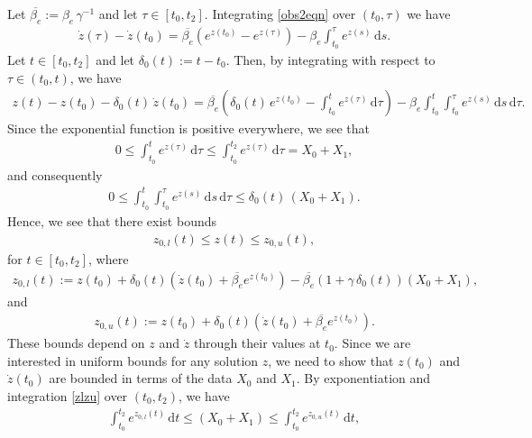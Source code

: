 \documentclass{article}
\newcommand{\ds}{\text{d}s}
\newcommand{\dtau}{\text{d}\tau}
\newcommand{\dt}{\text{d}t}
\newcommand{\be}{\beta_e}
\newcommand{\bb}{\overline{\be}}
\begin{document}
\proof Let $\bb := \be \, \gamma^{-1}$ and let $\tau \in [t_0,t_2]$. Integrating \eqref{obs2eqn} over $(t_{0},\tau)$ we have
%
\begin{align*}
    \dot{z}(\tau) - \dot{z}(t_{0}) = \bb \left( e^{z(t_{0})} - e^{z(\tau)} \right) - \be \int_{t_{0}}^\tau e^{z(s)} \, \ds. %
\end{align*}
%
Let $t \in [t_{0},t_{2}]$ and let $\delta_{0}(t) := t - t_{0}$. Then, by integrating with respect to $\tau \in (t_{0},t)$, we have
%
\begin{align*}
    z(t) - z(t_{0}) - \delta_{0}(t) \, \dot{z}(t_{0}) = \bb \left( \delta_{0}(t) \, e^{z(t_{0})} - \int_{t_{0}}^t e^{z(\tau)} \, \dtau \right) - \be \int_{t_{0}}^t \int_{t_{0}}^\tau e^{z(s)} \, \ds \, \dtau. %
\end{align*}
%
Since the exponential function is positive everywhere, we see that
%
\begin{align*}
    0 \leq \int_{t_{0}}^t e^{z(\tau)} \, \dtau \leq \int_{t_{0}}^{t_{2}} e^{z(\tau)} \, \dtau = X_0+X_1, %
\end{align*}
%
and consequently
%
\begin{align*}
    0 \leq \int_{t_{0}}^t \int_{t_{0}}^\tau e^{z(s)} \, \ds \, \dtau \leq \delta_{0}(t) \, (X_0+X_1). %
\end{align*}
%
Hence, we see that there exist bounds 
%
\begin{align} \label{zlzu}
    z_{0,l}(t) \leq z(t) \leq z_{0,u}(t),
\end{align}
%
for $t\in [t_0,t_2]$, where
%
\begin{align}
    z_{0,l}(t) := z(t_{0}) + \delta_{0}(t) \left( \dot{z}(t_{0}) + \bb e^{z(t_{0})} \right) - \bb(1 + \gamma \, \delta_{0}(t)) (X_0+X_1), \label{zl0}
\end{align}
%
and 
%
\begin{align}
    z_{0,u}(t) := z(t_{0}) + \delta_{0}(t) \left( \dot{z}(t_{0}) + \bb e^{z(t_{0})} \right). \label{zu0}
\end{align}
%
These bounds depend on $z$ and $\dot{z}$ through their values at $t_0$. Since we are interested in uniform bounds for any solution $z$, we need to show that $z(t_0)$ and $\dot{z}(t_0)$ are bounded in terms of the data $X_0$ and $X_1$. By exponentiation and integration \eqref{zlzu} over $(t_0,t_2)$, we have
%
\begin{align}
    \int_{t_{0}}^{t_{2}} e^{z_{0,l}(t)} \, \dt \leq (X_0+X_1) \leq \int_{t_{0}}^{t_{2}} e^{z_{0,u}(t)} \, \dt, \label{int3_obs2eqn0}
\end{align}
\end{document}
